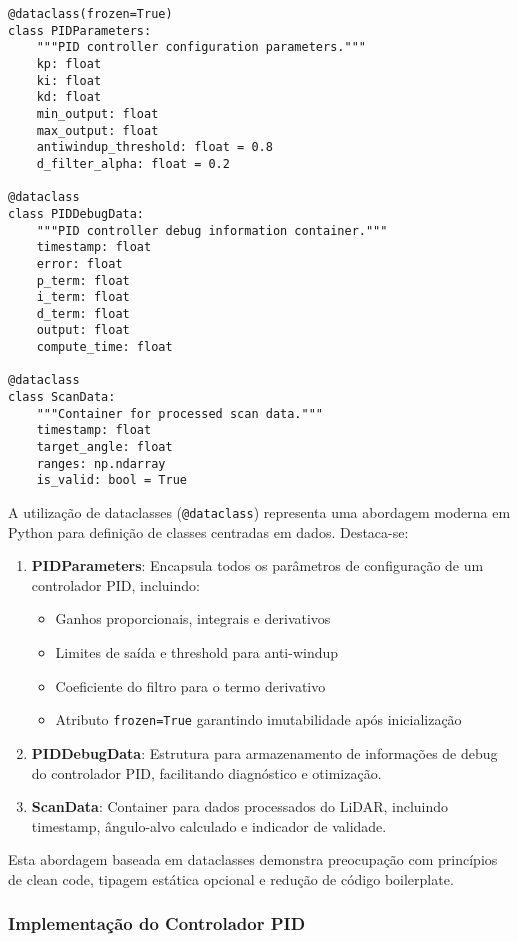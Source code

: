 \begin{verbatim}
@dataclass(frozen=True)
class PIDParameters:
    """PID controller configuration parameters."""
    kp: float
    ki: float
    kd: float
    min_output: float
    max_output: float
    antiwindup_threshold: float = 0.8
    d_filter_alpha: float = 0.2

@dataclass
class PIDDebugData:
    """PID controller debug information container."""
    timestamp: float
    error: float
    p_term: float
    i_term: float
    d_term: float
    output: float
    compute_time: float

@dataclass
class ScanData:
    """Container for processed scan data."""
    timestamp: float
    target_angle: float
    ranges: np.ndarray
    is_valid: bool = True
\end{verbatim}

A utilização de dataclasses (\texttt{@dataclass}) representa uma abordagem
moderna em Python para definição de classes centradas em dados. Destaca-se:

\begin{enumerate}
    \item \textbf{PIDParameters}: Encapsula todos os parâmetros de configuração de um controlador PID, incluindo:
          \begin{itemize}
              \item Ganhos proporcionais, integrais e derivativos
              \item Limites de saída e threshold para anti-windup
              \item Coeficiente do filtro para o termo derivativo
              \item Atributo \texttt{frozen=True} garantindo imutabilidade após inicialização
          \end{itemize}

    \item \textbf{PIDDebugData}: Estrutura para armazenamento de informações de debug do controlador PID, facilitando diagnóstico e otimização.

    \item \textbf{ScanData}: Container para dados processados do LiDAR, incluindo timestamp, ângulo-alvo calculado e indicador de validade.
\end{enumerate}

Esta abordagem baseada em dataclasses demonstra preocupação com princípios de
clean code, tipagem estática opcional e redução de código boilerplate.

\subsubsection{Implementação do Controlador PID}


